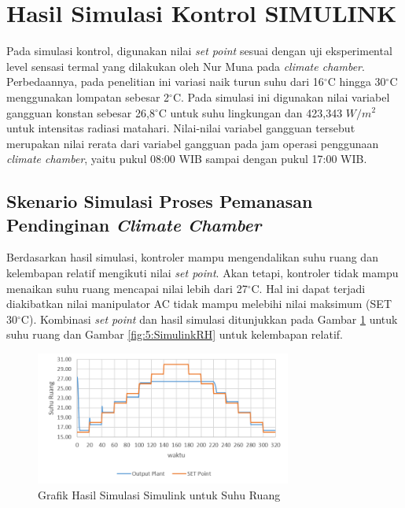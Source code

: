 \section{Hasil Simulasi Kontrol SIMULINK}

Pada simulasi kontrol, digunakan nilai \textit{set point} sesuai dengan uji eksperimental level sensasi termal yang dilakukan oleh Nur Muna pada \textit{climate chamber}\cite{skripsiMuna}. Perbedaannya, pada penelitian ini variasi naik turun suhu dari 16$^\circ$C hingga 30$^\circ$C menggunakan lompatan sebesar 2$^\circ$C. Pada simulasi ini digunakan nilai variabel gangguan konstan sebesar 26,8$^\circ$C untuk suhu lingkungan dan 423,343 $W/m^2$ untuk intensitas radiasi matahari. Nilai-nilai variabel gangguan tersebut merupakan nilai rerata dari variabel gangguan pada jam operasi penggunaan \textit{climate chamber}, yaitu pukul 08:00 WIB sampai dengan pukul 17:00 WIB.

\subsection{Skenario Simulasi Proses Pemanasan Pendinginan \textit{Climate Chamber}}

Berdasarkan hasil simulasi, kontroler mampu mengendalikan suhu ruang dan kelembapan relatif mengikuti nilai \textit{set point}. Akan tetapi, kontroler tidak mampu menaikan suhu ruang mencapai nilai lebih dari 27$^\circ$C. Hal ini dapat terjadi diakibatkan nilai manipulator AC tidak mampu melebihi nilai maksimum (SET 30$^\circ$C). Kombinasi \textit{set point} dan hasil simulasi ditunjukkan pada Gambar \ref{fig:5:SimulinkTd} untuk suhu ruang dan Gambar \ref{fig:5:SimulinkRH} untuk kelembapan relatif.

\begin{figure}[!h]
	\centering
	\includegraphics[width=0.75\textwidth]{figures/SimulinkTd}
	\caption{Grafik Hasil Simulasi Simulink untuk Suhu Ruang}
	\label{fig:5:SimulinkTd}
\end{figure}

